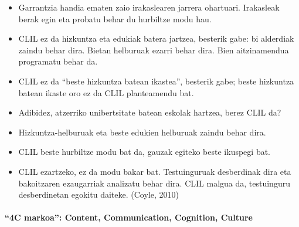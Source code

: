 \documentclass[
]{book}
\providecommand{\tightlist}{%
  \setlength{\itemsep}{0pt}\setlength{\parskip}{0pt}}
\begin{document}
\begin{itemize}
\tightlist
\item
  Garrantzia handia ematen zaio irakaslearen jarrera ohartuari. Irakasleak berak egin eta probatu behar du hurbiltze modu hau.
\item
  CLIL ez da hizkuntza eta edukiak batera jartzea, besterik gabe: bi alderdiak zaindu behar dira. Bietan helburuak ezarri behar dira. Bien aitzinamendua programatu behar da.
\item
  CLIL ez da ``beste hizkuntza batean ikastea'', besterik gabe; beste hizkuntza batean ikaste oro ez da CLIL planteamendu bat.
\item
  Adibidez, atzerriko unibertsitate batean eskolak hartzea, berez CLIL da?
\item
  Hizkuntza-helburuak eta beste edukien helburuak zaindu behar dira.
\item
  CLIL beste hurbiltze modu bat da, gauzak egiteko beste ikuspegi bat.
\item
  CLIL ezartzeko, ez da modu bakar bat. Testuinguruak desberdinak dira eta bakoitzaren ezaugarriak analizatu behar dira. CLIL malgua da, testuinguru desberdinetan egokitu daiteke. (Coyle, 2010)
\end{itemize}

\hypertarget{c-markoa-content-communication-cognition-culture}{%
\paragraph{``4C markoa'': Content, Communication, Cognition, Culture}\label{c-markoa-content-communication-cognition-culture}}
\end{document}
